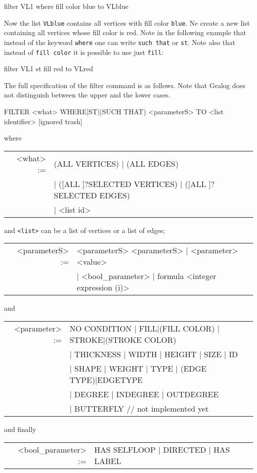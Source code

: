 \begin{tcolorbox}
  filter VL1 where fill color blue to VLblue
\end{tcolorbox}

Now the list \texttt{VLblue} contains all vertices with fill color
\texttt{blue}. Ne create a new list containing all vertices whose fill
color is red. Note in the following example that instead of the
keyword \texttt{where} one can write \texttt{such that} or
\texttt{st}. Note also that instead of \texttt{fill color} it is
possible to use just \texttt{fill}:

\begin{tcolorbox}
  filter VL1 st fill red to VLred
\end{tcolorbox}

The full specification of the filter command is as follows. Note that
Gralog does not distinguish between the upper and the lower cases.


\begin{tcolorbox}
  FILTER <what> WHERE|ST|(SUCH THAT) <parameterS> TO <list identifier>
  [ignored trash]
\end{tcolorbox}
 
\noindent where

\begin{tcolorbox}
  
  \begin{tabular}[H]{rl}
    <what> := &(ALL VERTICES) | (ALL EDGES)\\
              &| ([ALL ]?SELECTED VERTICES) | ([ALL ]?SELECTED EDGES)\\
              & | <list id> 
  \end{tabular}
and \texttt{<list>} can be a list of vertices or a list of edges;
\begin{tabular}[H]{rl}
  <parameterS> := &<parameterS> <parameterS> | <parameter> <value> \\
                  & | <bool\_parameter> | formula <integer expression
                    (i)>\\
  \end{tabular}
  and
  \begin{tabular}[H]{rl}
  <parameter> := &NO CONDITION | FILL|(FILL COLOR) | STROKE|(STROKE
    COLOR) \\
                 &| THICKNESS | WIDTH | HEIGHT | SIZE | ID\\
                 &| SHAPE | WEIGHT | TYPE | (EDGE TYPE)|EDGETYPE \\
                 &| DEGREE | INDEGREE | OUTDEGREE\\
                 &| BUTTERFLY // not implemented yet
  \end{tabular}
  and finally
  \begin{tabular}[H]{rl}
  <bool\_parameter> := &HAS SELFLOOP | DIRECTED | HAS LABEL
  \end{tabular}
\end{tcolorbox}

